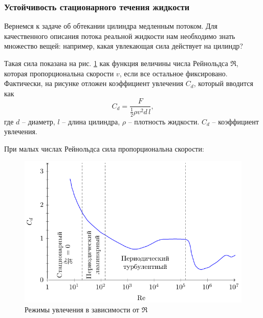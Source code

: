 \subsubsection{Устойчивость стационарного течения жидкости}
Вернемся к задаче об обтекании цилиндра медленным потоком. Для качественного описания потока реальной жидкости нам необходимо знать множество вещей: например, какая увлекающая сила действует на цилиндр? 

Такая сила показана на рис. \ref{fig:cdre} как функция величины числа Рейнольдса $\Re$, которая пропорциональна скорости $v$, если все остальное фиксировано. Фактически, на рисунке отложен коэффициент увлечения $C_d$, который вводится как 
\begin{equation}
    C_d  = \frac{F}{\frac{1}{2} \rho v^2 d\,l},
\end{equation}
где $d$ -- диаметр, $l$ -- длина цилиндра, 
$\rho$ -- плотность жидкости. $C_d$ -- коэффициент увлечения.

При малых числах Рейнольдса сила пропорциональна скорости:
\begin{figure}[H]
    \centering
    \includegraphics[scale=1.2]{img/recd}
    \caption{Режимы увлечения в зависимости от  $\Re$}
    \label{fig:cdre}
\end{figure}



